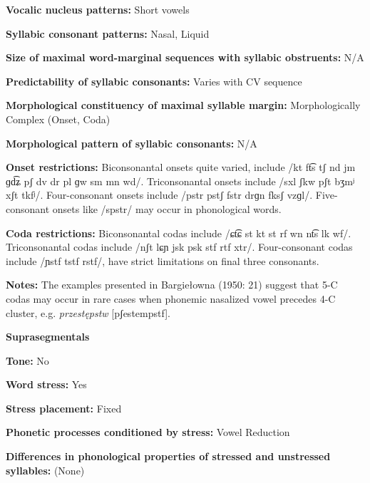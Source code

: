 \textbf{Vocalic nucleus patterns:} Short vowels



\textbf{Syllabic consonant patterns:} Nasal, Liquid



\textbf{Size of maximal word{}-marginal sequences with syllabic obstruents:} N/A



\textbf{Predictability of syllabic consonants:} Varies with CV sequence



\textbf{Morphological constituency of maximal syllable margin:} Morphologically Complex (Onset, Coda)



\textbf{Morphological pattern of syllabic consonants:} N/A



\textbf{Onset restrictions:} Biconsonantal onsets quite varied, include /kt ft͡s tʃ nd jm ɡd͡ʑ pʃ dv dr pl ɡw sm mn wd/. Triconsonantal onsets include /sxl ʃkw pʃt bʒmʲ xʃt tkfʲ/. Four-consonant onsets include /pstr pstʃ fstr drɡn fksʃ vzɡl/. Five-consonant onsets like /spstr/ may occur in phonological words.



\textbf{Coda restrictions:} Biconsonantal codas include /ɕt͡ɕ st kt st rf wn nt͡s lk wf/. Triconsonantal codas include /nʃt lɕɲ jsk psk stf rtf xtr/. Four-consonant codas include /ɲstf tstf rstf/, have strict limitations on final three consonants.



\textbf{Notes:} The examples presented in Bargiełowna (1950: 21) suggest that 5-C codas may occur in rare cases when phonemic nasalized vowel precedes 4-C cluster, e.g. \textit{przestępstw} [pʃestempstf].



\textbf{Suprasegmentals}



\textbf{Tone:} No



\textbf{Word stress:} Yes



\textbf{Stress placement:} Fixed



\textbf{Phonetic processes conditioned by stress:} Vowel Reduction



\textbf{Differences in phonological properties of stressed and unstressed syllables:} (None)



